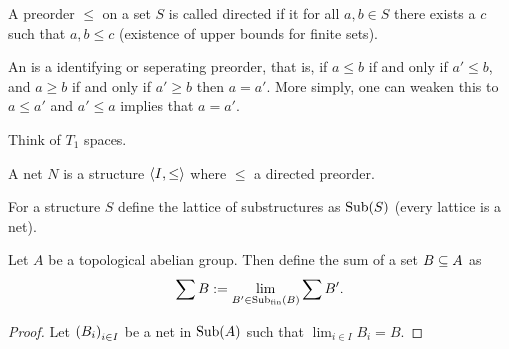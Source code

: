\documentclass[8pt,a4paper]{article}
\begin{document}
\begin{definition}[Directedness]
    A preorder $\leq$ on a set $S$ is called directed if it for all $a,b\in S$ there exists a $c$ such that $a,b\leq c$ (existence of upper bounds for finite sets).
\end{definition}


\begin{definition}[order]
    An  is a identifying or seperating preorder, that is, if $a\leq b$ if and only if $a'\leq b$, and $a\geq b$ if and only if $a'\geq b$ then $a=a'$. More simply, one can weaken this to $a\leq a'$ and $a'\leq a$ implies that $a=a'$.
\end{definition}

\begin{remark}
    Think of $T_1$ spaces.
\end{remark}


\begin{definition}[net]
    A net $N$ is a structure $\struct{I,\leq}$ where $\leq$ a directed preorder.
\end{definition}



\begin{definition}[substructures]
    For a structure $S$ define the lattice of substructures as $\mathop\mathrm{Sub}\nolimits(S)$ (every lattice is a net).
\end{definition}


\begin{definition}
    Let $A$ be a topological abelian group. Then define the sum of a set $B\subseteq A$ as
    $$
    \sum{B}:=\lim_{B'\in\mathop\mathrm{Sub}\nolimits_{\mathrm{fin}}(B)}{\sum{B'}}.
    $$
\end{definition}

\begin{lemma}
    
\end{lemma}

\begin{proof}
    Let $\net[i\in I]{B_i}$ be a net in $\mathop\mathrm{Sub}\nolimits(A)$ such that $\lim_{i\in I}{B_i}=B$.
\end{proof}
\end{document}

